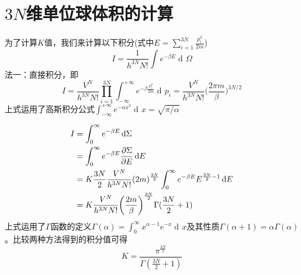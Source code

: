 \documentclass[UTF8,oneside,openany]{ctexbook}
\DeclareMathOperator\dif{d\!}
\begin{document}
\chapter{$3N$维单位球体积的计算}\label{vo}
为了计算$K$值，我们来计算以下积分(式中$E=\sum_{i=1}^{3N}\frac{p_i^2}{2m}$)
\[
I=\frac{1}{h^{3N}N!}\int e^{-\beta E}\dif\Omega
\]
法一：直接积分，即
\[
I=\frac{V^N}{h^{3N}N!}\prod_{i=1}^{3N}\int_{-\infty}^{+\infty}e^{-\beta\frac{p_i^2}{2m}}\dif p_i=\frac{V^N}{h^{3N}N!}\biggl(\frac{2\pi m}{\beta}\biggr)^{3N/2}
\]
上式运用了高斯积分公式$\int_{-\infty}^{+\infty}e^{-\alpha x^2}\dif x=\sqrt{\pi/\alpha}$

\begin{align}
I&=\int_{0}^{\infty}e^{-\beta E}\dif\Sigma\notag\\
&=\int_{0}^{\infty}e^{-\beta E}\frac{\partial\Sigma}{\partial E}\dif E\notag\\
&=K\frac{3N}{2}\frac{V^N}{h^{3N}N!}(2m)^{\frac{3N}{2}}\int_{0}^{\infty}e^{-\beta E}E^{\frac{3N}{2}-1}\dif E\notag\\
&=K\frac{V^N}{h^{3N}N!}\biggl(\frac{2m}{\beta}\biggr)^{\frac{3N}{2}}\Gamma(\frac{3N}{2}+1)\notag
\end{align}
上式运用了$\Gamma$函数的定义$\Gamma(\alpha)=\int_{0}^{\infty}x^{\alpha-1}e^{-x}\dif x$及其性质$\Gamma(\alpha+1)=\alpha\Gamma(\alpha)$。比较两种方法得到的积分值可得
\[
K=\frac{\pi^{\frac{3N}{2}}}{\Gamma(\frac{3N}{2}+1)}
\]
\end{document}
